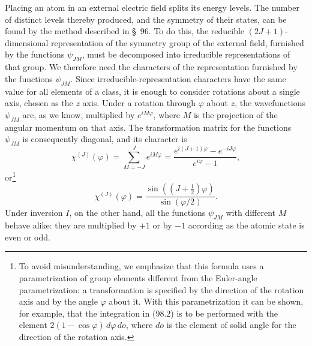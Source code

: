Placing an atom in an external electric field splits its energy levels. The number of distinct levels thereby produced, and the symmetry of their states, can be found by the method described in §~96. To do this, the reducible $(2J+1)$-dimensional representation of the symmetry group of the external field, furnished by the functions $\psi_{JM}$, must be decomposed into irreducible representations of that group. We therefore need the characters of the representation furnished by the functions $\psi_{JM}$. Since irreducible-representation characters have the same value for all elements of a class, it is enough to consider rotations about a single axis, chosen as the $z$ axis. Under a rotation through $\varphi$ about $z$, the wavefunctions $\psi_{JM}$ are, as we know, multiplied by $e^{iM\varphi}$, where $M$ is the projection of the angular momentum on that axis. The transformation matrix for the functions $\psi_{JM}$ is consequently diagonal, and its character is
\[
 \chi^{(J)}(\varphi)=\sum_{M=-J}^{J}e^{iM\varphi}
 =\frac{e^{i(J+1)\varphi}-e^{-iJ\varphi}}{e^{i\varphi}-1},
\]
or\footnote{To avoid misunderstanding, we emphasize that this formula uses a parametrization of group elements different from the Euler-angle parametrization: a transformation is specified by the direction of the rotation axis and by the angle $\varphi$ about it. With this parametrization it can be shown, for example, that the integration in (98.2) is to be performed with the element $2(1-\cos\varphi)\,d\varphi\,do$, where $do$ is the element of solid angle for the direction of the rotation axis.}
\begin{equation}
 \chi^{(J)}(\varphi)=\frac{\sin\!\left((J+\tfrac12)\varphi\right)}{\sin(\varphi/2)}.
 \tag{98.3}
\end{equation}
Under inversion $I$, on the other hand, all the functions $\psi_{JM}$ with different $M$ behave alike: they are multiplied by $+1$ or by $-1$ according as the atomic state is even or odd.

